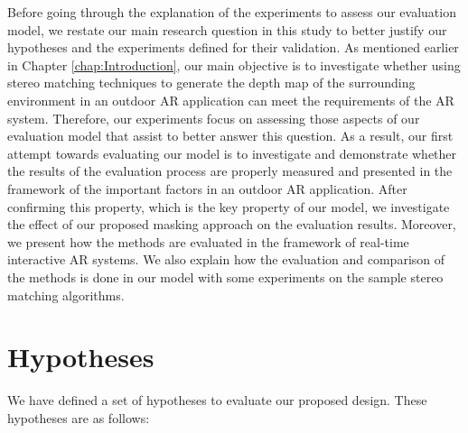 Before going through the explanation of the experiments to assess our evaluation model, we restate our main research question in this
study to better justify our hypotheses and the experiments defined for their validation. 
As mentioned earlier in Chapter \ref{chap:Introduction}, our main objective is to investigate whether using 
stereo matching techniques to generate the depth map of the 
surrounding environment in an outdoor AR application can meet the requirements of the AR system. 
Therefore, our experiments focus 
on assessing those aspects of our evaluation model that assist to better answer this question.
As a result, our first attempt towards evaluating our model is to investigate and demonstrate whether the results of the evaluation process 
are properly measured and presented in the framework of the important factors in an outdoor AR application.
After confirming this property, which is the key property of our model, we investigate the effect of our proposed masking 
approach on the evaluation results. Moreover, we present how the methods are evaluated in the framework of 
real-time interactive AR systems.
We also explain how the evaluation and comparison of the methods is done in our model with some
experiments on the sample stereo matching algorithms.

\section{Hypotheses}

We have defined a set of hypotheses to evaluate our proposed design. These hypotheses are as follows:

